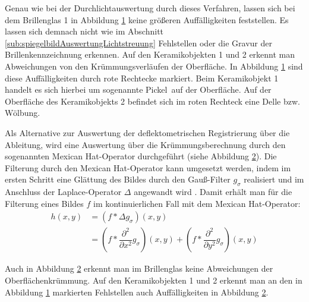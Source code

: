 {
	\begin{figure}[H]
		\centering
		
		\label{tikz:abbAbleitungRegistrierungSpiegel}
	\end{figure}
}

\noindent
Genau wie bei der Durchlichtauswertung durch dieses Verfahren, lassen sich bei dem Brillenglas 1 in Abbildung \ref{tikz:abbAbleitungRegistrierungSpiegel} keine größeren Auffälligkeiten feststellen.
Es lassen sich demnach nicht wie im Abschnitt \ref{sub:spiegelbildAuswertungLichtstreuung} Fehlstellen oder die Gravur der Brillenkennzeichnung erkennen.
Auf den Keramikobjekten 1 und 2 erkennt man Abweichungen von den Krümmungsverläufen der Oberfläche.
In Abbildung \ref{tikz:abbAbleitungRegistrierungSpiegel} sind diese Auffälligkeiten durch rote Rechtecke markiert.
Beim Keramikobjekt 1 handelt es sich hierbei um sogenannte  \glqq Pickel\grqq ~auf der Oberfläche.
Auf der Oberfläche des Keramikobjekts 2 befindet sich im roten Rechteck eine Delle bzw. Wölbung.

\p
Als Alternative zur Auswertung der deflektometrischen Registrierung über die Ableitung, wird eine Auswertung über die Krümmungsberechnung durch den sogenannten \glqq Mexican Hat\grqq -Operator durchgeführt (siehe Abbildung \ref{tikz:abbMexicanHatRegistrierung}).
Die Filterung durch den \glqq Mexican Hat\grqq -Operator kann umgesetzt werden, indem im ersten Schritt eine Glättung des Bildes durch den Gauß-Filter $g_\sigma$ realisiert und im Anschluss der Laplace-Operator $\Delta$ angewandt wird \cite{mexicanHat}.
Damit erhält man für die Filterung eines Bildes $f$ im kontinuierlichen Fall mit dem \glqq Mexican Hat\grqq -Operator:
%
\begin{equation*}
	\begin{split}
		h(x,y) &= (f \ast \Delta g_\sigma)(x,y) \\
		&= (f \ast \dfrac{\partial^2}{\partial x^2} g_\sigma)(x,y) + (f \ast \dfrac{\partial^2}{\partial y^2} g_\sigma)(x,y)
	\end{split}
\end{equation*}

{
	\begin{figure}[H]
		\centering
		
		\label{tikz:abbMexicanHatRegistrierung}
	\end{figure}
}

\noindent
Auch in Abbildung \ref{tikz:abbMexicanHatRegistrierung} erkennt man im Brillenglas keine Abweichungen der Oberflächen\-krümmung.
Auf den Keramikobjekten 1 und 2 erkennt man an den in Abbildung \ref{tikz:abbAbleitungRegistrierungSpiegel} markierten Fehlstellen auch Auffälligkeiten in Abbildung \ref{tikz:abbMexicanHatRegistrierung}.